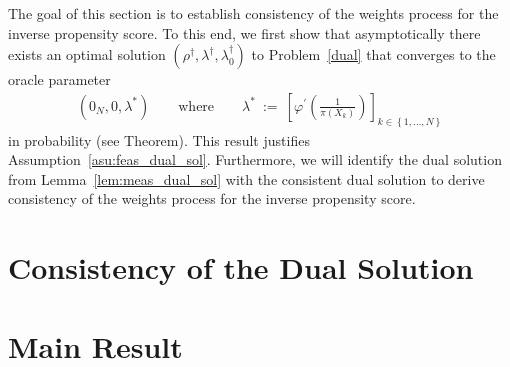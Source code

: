 The goal of this section is to establish consistency of the
weights process for the inverse propensity score.
To this end,
we first show that asymptotically there exists an optimal solution 
$
(\rho^\dagger,\lambda^\dagger,\lambda_0^\dagger)
$
to Problem~\ref{dual} that converges to the oracle parameter
\begin{align*}
  (0_N,0,\lambda^*)
  \qquad
  \text{where}
  \qquad
  \lambda^*
  \ 
  :=
  \ 
\left[ 
\varphi^{'} \left( \frac{1}{\pi(X_k)} \right)
\right]_{k\in \left\{ 1,\ldots,N \right\}}
\end{align*}
in probability (see Theorem).
This result justifies Assumption~\ref{asu:feas_dual_sol}.
Furthermore, we will identify the dual solution from Lemma~\ref{lem:meas_dual_sol} 
with the consistent dual solution to derive consistency of the weights process for the inverse propensity score.
\section{Consistency of the Dual Solution}
  
\section{Main Result}



